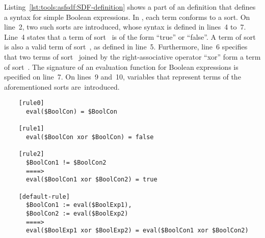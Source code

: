 Listing~\ref{lst:tools:asfsdf:SDF-definition} shows a part of an \SDF definition that defines a syntax for simple Boolean expressions.
In \ASFSDF, each term conforms to a sort.
On line~2, two such sorts are introduced, whose syntax is defined in lines~4 to~7.
Line~4 states that a term of sort~ is of the form ``true'' or ``false''.
A term of sort~ is also a valid term of sort~, as defined in line~5.
Furthermore, line~6 specifies that two terms of sort~ joined by the right-associative operator ``xor'' form a term of sort~.
The signature of an evaluation function for Boolean expressions is specified on line~7.
On lines~9 and~10, variables that represent terms of the aforementioned sorts are~introduced.

\begin{listing}
  \lstset{
    language=asf,
    style=asf,
    label=lst:tools:asfsdf:ASF-ex,
    caption=\ASF rule for the evaluation of simple Boolean expressions,
    numbers=left
  }
  \begin{lstlisting}
    [rule0]
      eval($BoolCon) = $BoolCon

    [rule1]
      eval($BoolCon xor $BoolCon) = false

    [rule2]
      $BoolCon1 != $BoolCon2
      ====>
      eval($BoolCon1 xor $BoolCon2) = true

    [default-rule]
      $BoolCon1 := eval($BoolExp1),
      $BoolCon2 := eval($BoolExp2)
      ====>
      eval($BoolExp1 xor $BoolExp2) = eval($BoolCon1 xor $BoolCon2)
  \end{lstlisting}
\end{listing}

